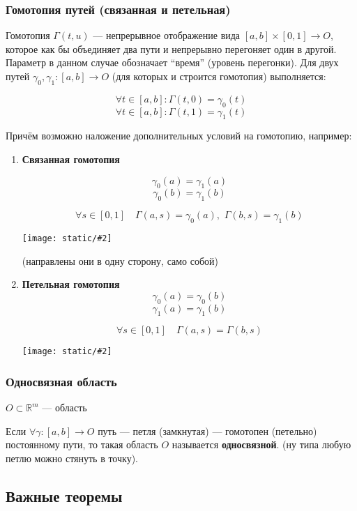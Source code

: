 \documentclass{article}
\def\dbl{\,\,}
\def\images#1#2{\begin{center}\texttt{[image: static/\#2]}\end{center}}
\begin{document}
\subsubsection{Гомотопия путей (связанная и петельная)}

Гомотопия $\Gamma(t, u)$ --- непрерывное отображение вида $[a, b] \times [0, 1] \rightarrow O$, которое как бы объединяет два пути и непрерывно перегоняет один в другой. Параметр в данном случае обозначает ``время'' (уровень перегонки). Для двух путей $\gamma_0, \gamma_1: [a, b] \rightarrow O$ (для которых и строится гомотопия) выполняется:

\[\forall t \in [a, b]: \Gamma(t, 0) = \gamma_0(t)\]
\[\forall t \in [a, b]: \Gamma(t, 1) = \gamma_1(t)\]

Причём возможно наложение дополнительных условий на гомотопию, например:

\begin{enumerate}
    \item \textbf{Связанная гомотопия}
    
    \[\gamma_0(a) = \gamma_1(a)\]
    \[\gamma_0(b) = \gamma_1(b)\]

    \[\forall s \in [0, 1] \quad \Gamma(a, s) = \gamma_0(a), \dbl \Gamma(b, s) = \gamma_1(b)\]

    \images{0.4}{gomotop_sv.jpg}

    (направлены они в одну сторону, само собой)

    \item \textbf{Петельная гомотопия}
    \[\gamma_0(a) = \gamma_0(b)\]
    \[\gamma_1(a) = \gamma_1(b)\]

    \[\forall s \in [0, 1] \quad \Gamma(a, s) = \Gamma(b, s)\]

    \images{0.3}{gomotop_pet.jpg}
\end{enumerate}

\subsubsection{Односвязная область}

$O \subset \mathbb{R}^m$ --- область

Если $\forall \gamma: [a, b] \rightarrow O$ путь --- петля (замкнутая) --- гомотопен (петельно) постоянному пути, то такая область $O$ называется \textbf{односвязной}. (ну типа любую петлю можно стянуть в точку).


\newpage

\subsection{Важные теоремы}
\end{document}
